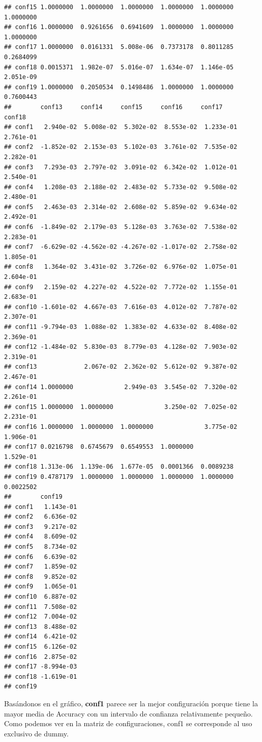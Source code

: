 \documentclass[
]{article}
\begin{document}
\begin{verbatim}
## conf15 1.0000000  1.0000000  1.0000000  1.0000000  1.0000000  1.0000000 
## conf16 1.0000000  0.9261656  0.6941609  1.0000000  1.0000000  1.0000000 
## conf17 1.0000000  0.0161331  5.008e-06  0.7373178  0.8011285  0.2684099 
## conf18 0.0015371  1.982e-07  5.016e-07  1.634e-07  1.146e-05  2.051e-09 
## conf19 1.0000000  0.2050534  0.1498486  1.0000000  1.0000000  0.7600443 
##        conf13     conf14     conf15     conf16     conf17     conf18    
## conf1   2.940e-02  5.008e-02  5.302e-02  8.553e-02  1.233e-01  2.761e-01
## conf2  -1.852e-02  2.153e-03  5.102e-03  3.761e-02  7.535e-02  2.282e-01
## conf3   7.293e-03  2.797e-02  3.091e-02  6.342e-02  1.012e-01  2.540e-01
## conf4   1.208e-03  2.188e-02  2.483e-02  5.733e-02  9.508e-02  2.480e-01
## conf5   2.463e-03  2.314e-02  2.608e-02  5.859e-02  9.634e-02  2.492e-01
## conf6  -1.849e-02  2.179e-03  5.128e-03  3.763e-02  7.538e-02  2.283e-01
## conf7  -6.629e-02 -4.562e-02 -4.267e-02 -1.017e-02  2.758e-02  1.805e-01
## conf8   1.364e-02  3.431e-02  3.726e-02  6.976e-02  1.075e-01  2.604e-01
## conf9   2.159e-02  4.227e-02  4.522e-02  7.772e-02  1.155e-01  2.683e-01
## conf10 -1.601e-02  4.667e-03  7.616e-03  4.012e-02  7.787e-02  2.307e-01
## conf11 -9.794e-03  1.088e-02  1.383e-02  4.633e-02  8.408e-02  2.369e-01
## conf12 -1.484e-02  5.830e-03  8.779e-03  4.128e-02  7.903e-02  2.319e-01
## conf13             2.067e-02  2.362e-02  5.612e-02  9.387e-02  2.467e-01
## conf14 1.0000000              2.949e-03  3.545e-02  7.320e-02  2.261e-01
## conf15 1.0000000  1.0000000              3.250e-02  7.025e-02  2.231e-01
## conf16 1.0000000  1.0000000  1.0000000              3.775e-02  1.906e-01
## conf17 0.0216798  0.6745679  0.6549553  1.0000000              1.529e-01
## conf18 1.313e-06  1.139e-06  1.677e-05  0.0001366  0.0089238            
## conf19 0.4787179  1.0000000  1.0000000  1.0000000  1.0000000  0.0022502 
##        conf19    
## conf1   1.143e-01
## conf2   6.636e-02
## conf3   9.217e-02
## conf4   8.609e-02
## conf5   8.734e-02
## conf6   6.639e-02
## conf7   1.859e-02
## conf8   9.852e-02
## conf9   1.065e-01
## conf10  6.887e-02
## conf11  7.508e-02
## conf12  7.004e-02
## conf13  8.488e-02
## conf14  6.421e-02
## conf15  6.126e-02
## conf16  2.875e-02
## conf17 -8.994e-03
## conf18 -1.619e-01
## conf19
\end{verbatim}

Basándonos en el gráfico, \textbf{conf1} parece ser la mejor
configuración porque tiene la mayor media de Accuracy con un intervalo
de confianza relativamente pequeño. Como podemos ver en la matriz de
configuraciones, conf1 se corresponde al uso exclusivo de dummy.
\end{document}
